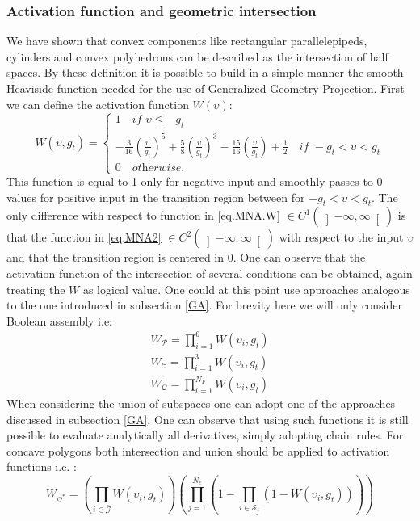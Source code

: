 \subsubsection{Activation function and geometric intersection}
We have shown that convex components like rectangular parallelepipeds, cylinders and convex polyhedrons can be described as the intersection of half spaces. By these definition it is possible to build in a simple manner the smooth Heaviside function needed for the use of Generalized Geometry Projection. First we can define the activation function $W(\upsilon)$:
\begin{equation}
\label{eq.MNA2}
W(\upsilon,g_t)=\begin{cases}
1 \quad \textit{if }  \upsilon\leq -g_t\\
-\frac{3}{16}\left(\frac{\upsilon}{g_t}\right)^5
+\frac{5}{8}\left(\frac{\upsilon}{g_t}\right)^3
-\frac{15}{16}\left(\frac{\upsilon}{g_t}\right)+\frac{1}{2}\quad \textit{if } -g_t<\upsilon< g_t\\
0 \quad \textit{otherwise.} 
\end{cases}
\end{equation}
This function is equal to 1 only for negative input and smoothly passes to 0 values for positive input in the transition region between for $-g_t<\upsilon< g_t$.  The only difference with respect to function in \ref{eq.MNA.W} $\in C^1(\left]-\infty,\infty\right[)$ is that the function in \ref{eq.MNA2} $\in C^2(\left]-\infty,\infty\right[)$ with respect to the input $\upsilon$ and that the transition region is centered in 0.  One can observe that the activation function of the intersection of several conditions can be obtained, again treating the $W$ as logical value. One could at this point use approaches analogous to the one introduced in subsection \ref{GA}. For brevity here we will only consider Boolean assembly i.e:
\begin{eqnarray}
W_{\mathscr{P}}=\prod_{i=1}^6{W(\upsilon_i,g_t)}\\
W_{\mathscr{C}}=\prod_{i=1}^3{W(\upsilon_i,g_t)}\\
W_{\mathscr{Q}}=\prod_{i=1}^{N_F}{W(\upsilon_i,g_t)}
\end{eqnarray}
When considering the union of subspaces one can adopt one of the approaches discussed in subsection \ref{GA}. One can observe that using such functions it is still possible to evaluate analytically all derivatives, simply adopting chain rules. For concave polygons both intersection and union should be applied to activation functions i.e. :
\begin{equation}
W_{\mathscr{Q}^*}=\left(\prod_{i\in\bar{\mathscr{G}}}{W\left(\upsilon_i,g_t\right)}\right)\left(\prod_{j=1}^{N_c}{\left(1-\prod_{i\in\mathscr{S}_j}{\left(1-W\left(\upsilon_i,g_t\right)\right)}\right)}\right)
\end{equation}
